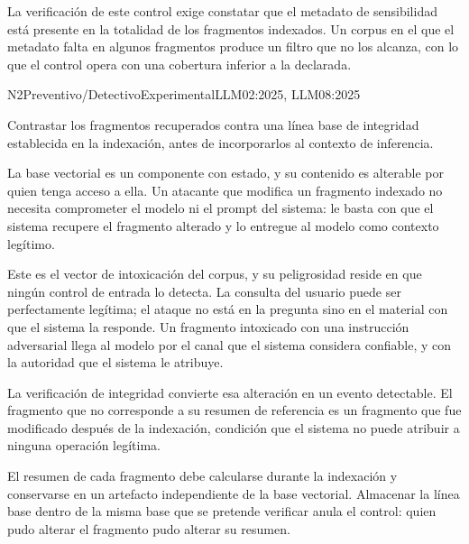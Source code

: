 La verificación de este control exige constatar que el metadato de sensibilidad está presente en la totalidad de los fragmentos indexados. Un corpus en el que el metadato falta en algunos fragmentos produce un filtro que no los alcanza, con lo que el control opera con una cobertura inferior a la declarada.


  {N2}{Preventivo/Detectivo}{Experimental}{LLM02:2025, LLM08:2025}

Contrastar los fragmentos recuperados contra una línea base de integridad establecida en la indexación, antes de incorporarlos al contexto de inferencia.

La base vectorial es un componente con estado, y su contenido es alterable por quien tenga acceso a ella. Un atacante que modifica un fragmento indexado no necesita comprometer el modelo ni el prompt del sistema: le basta con que el sistema recupere el fragmento alterado y lo entregue al modelo como contexto legítimo.

Este es el vector de intoxicación del corpus, y su peligrosidad reside en que ningún control de entrada lo detecta. La consulta del usuario puede ser perfectamente legítima; el ataque no está en la pregunta sino en el material con que el sistema la responde. Un fragmento intoxicado con una instrucción adversarial llega al modelo por el canal que el sistema considera confiable, y con la autoridad que el sistema le atribuye.

La verificación de integridad convierte esa alteración en un evento detectable. El fragmento que no corresponde a su resumen de referencia es un fragmento que fue modificado después de la indexación, condición que el sistema no puede atribuir a ninguna operación legítima.

El resumen de cada fragmento debe calcularse durante la indexación y conservarse en un artefacto independiente de la base vectorial. Almacenar la línea base dentro de la misma base que se pretende verificar anula el control: quien pudo alterar el fragmento pudo alterar su resumen.

